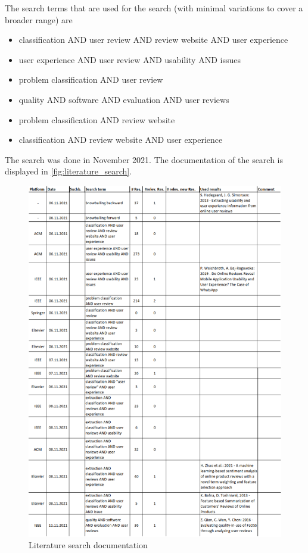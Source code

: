 The search terms that are used for the search (with minimal variations to cover a broader range) are
\begin{itemize}
    \item classification AND user review AND review website AND user experience
    \item user experience AND user review AND usability AND issues
    \item problem classification AND user review
    \item quality AND software AND evaluation AND user reviews
    \item problem classification AND review website
    \item classification AND review website AND user experience
\end{itemize}

The search was done in November 2021. The documentation of the search is displayed in \autoref{fig:literature_search}.

\begin{figure}
    \centering
    \includegraphics[width=\textwidth]{images/Thema4_LiteratureSearch.png}
    \caption{Literature search documentation}
    \label{fig:literature_search}
\end{figure}

